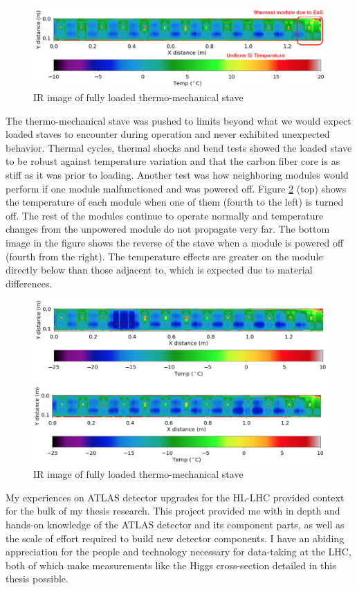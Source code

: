 \begin{figure}[!h]
        \centering
    \includegraphics[width=.8\textwidth]{Pictures/IRimagetotal.png}
    \caption{IR image of fully loaded thermo-mechanical stave}
    \label{fig:IRimagetotal}
\end{figure} 
 
The thermo-mechanical stave was pushed to limits beyond what we would expect loaded staves to encounter during operation and never exhibited unexpected behavior. Thermal cycles, thermal shocks and bend tests showed the loaded stave to be robust against temperature variation and that the carbon fiber core is as stiff as it was prior to loading. Another test was how neighboring modules would perform if one module malfunctioned and was powered off. Figure \ref{fig:moduleoff} (top) shows the temperature of each module when one of them (fourth to the left) is turned off. The rest of the modules continue to operate normally and temperature changes from the unpowered module do not propagate very far. The bottom image in the figure shows the reverse of the stave when a module is powered off (fourth from the right). The temperature effects are greater on the module directly below than those adjacent to, which is expected due to material differences. 

\begin{figure}[!h]
        \centering
    \includegraphics[width=.7\textwidth]{Pictures/moduleoff.png}
    \caption{IR image of fully loaded thermo-mechanical stave}
    \label{fig:moduleoff}
\end{figure}

My experiences on ATLAS detector upgrades for the HL-LHC provided context for the bulk of my thesis research. This project provided me with in depth and hands-on knowledge of the ATLAS detector and its component parts, as well as the scale of effort required to build new detector components. I have an abiding appreciation for the people and technology necessary for data-taking at the LHC, both of which make measurements like the Higgs cross-section detailed in this thesis possible.
